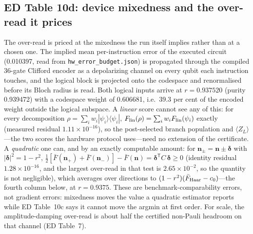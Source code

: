 \documentclass[10pt,a4paper]{article}
\begin{document}
\subsection*{ED Table 10d: device mixedness and the over-read it prices}
The over-read is priced at the mixedness the run itself implies rather than at a
chosen one. The implied mean per-instruction error of the executed circuit (0.010397,
read from \texttt{hw\_error\_budget.json}) is propagated through the compiled
36-gate Clifford encoder as a depolarizing channel on every qubit each instruction
touches, and the logical block is projected onto the codespace and renormalised
before its Bloch radius is read. Both logical inputs arrive at $r=0.937520$ (purity
0.939472) with a codespace weight of 0.606681, i.e.\ 39.3 per cent of the encoded weight
outside the logical subspace. A \emph{linear} score cannot see any of this: for
every decomposition $\rho=\sum_iw_i|\psi_i\rangle\langle\psi_i|$,
$F_{\rm lin}(\rho)=\sum_iw_iF_{\rm lin}(\psi_i)$ exactly (measured residual $1.11\times 10^{-16}$), so
the post-selected branch population and $\langle Z_L\rangle$---the two scores the
hardware protocol uses---need no extension of the certificate. A \emph{quadratic}
one can, and by an exactly computable amount: for
$\mathbf n_\pm=\mathbf n\pm\boldsymbol\delta$ with
$|\boldsymbol\delta|^2=1-r^2$,
$\tfrac12[\bar F(\mathbf n_+)+\bar F(\mathbf n_-)]-\bar F(\mathbf n)=\boldsymbol\delta^{\mathsf T}C\,\boldsymbol\delta\ge0$
(identity residual $1.28\times 10^{-16}$, and
the largest over-read in that test is $2.65\times 10^{-2}$, so the quantity is not negligible), which
averages over directions to $(1-r^2)(\bar F_{\rm Haar}-c_0)$---the fourth column
below, at $r=0.9375$. These are benchmark-comparability errors, not gradient errors:
mixedness moves the value a quadratic estimator reports while ED Table~10c says it
cannot move the argmin at first order. For scale, the amplitude-damping over-read is
about half the certified non-Pauli headroom on that channel (ED Table~7).
\end{document}
